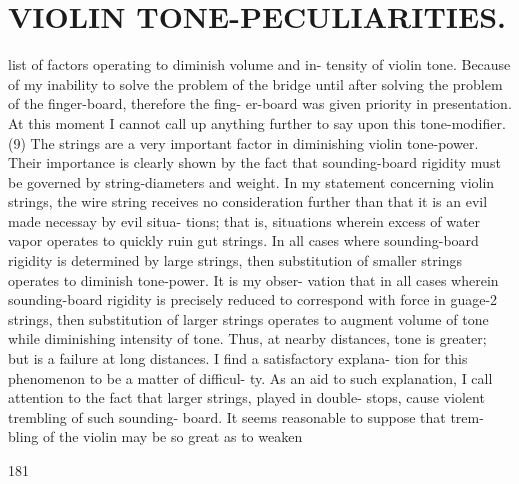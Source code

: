 \documentclass{article}
\begin{document}
\section*{VIOLIN TONE-PECULIARITIES.}
list of factors operating to diminish volume and in- tensity of violin tone. Because of my inability to solve the problem of the bridge until after solving the problem of the finger-board, therefore the fing- er-board was given priority in presentation. At this moment I cannot call up anything further to say upon this tone-modifier. (9) The strings are a very important factor in diminishing violin tone-power. Their importance is clearly shown by the fact that sounding-board rigidity must be governed by string-diameters and weight. In my statement concerning violin strings, the wire string receives no consideration further than that it is an evil made necessay by evil situa- tions; that is, situations wherein excess of water vapor operates to quickly ruin gut strings. In all cases where sounding-board rigidity is determined by large strings, then substitution of smaller strings operates to diminish tone-power. It is my obser- vation that in all cases wherein sounding-board rigidity is precisely reduced to correspond with force in guage-2 strings, then substitution of larger strings operates to augment volume of tone while diminishing intensity of tone. Thus, at nearby distances, tone is greater; but is a failure at long distances. I find a satisfactory explana- tion for this phenomenon to be a matter of difficul- ty. As an aid to such explanation, I call attention to the fact that larger strings, played in double- stops, cause violent trembling of such sounding- board. It seems reasonable to suppose that trem- bling of the violin may be so great as to weaken

181
\end{document}
